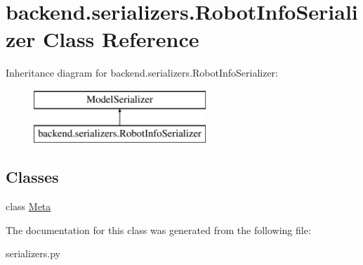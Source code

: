 \hypertarget{classbackend_1_1serializers_1_1_robot_info_serializer}{}\section{backend.\+serializers.\+Robot\+Info\+Serializer Class Reference}
\label{classbackend_1_1serializers_1_1_robot_info_serializer}
Inheritance diagram for backend.\+serializers.\+Robot\+Info\+Serializer\+:\begin{figure}[H]
\begin{center}
\leavevmode
\includegraphics[height=2.000000cm]{classbackend_1_1serializers_1_1_robot_info_serializer}
\end{center}
\end{figure}
\subsection*{Classes}
\begin{DoxyCompactItemize}
\item 
class \hyperlink{classbackend_1_1serializers_1_1_robot_info_serializer_1_1_meta}{Meta}
\end{DoxyCompactItemize}


The documentation for this class was generated from the following file\+:\begin{DoxyCompactItemize}
\item 
serializers.\+py\end{DoxyCompactItemize}
